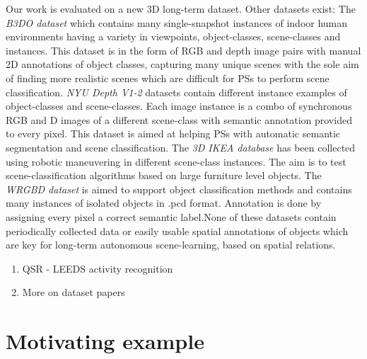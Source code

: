 \documentclass[letterpaper, 10 pt, conference]{ieeeconf}  %
\begin{document}
Our work is evaluated on a new 3D long-term dataset. Other datasets exist: The \textit{B3DO dataset} \cite{Janoch:ICCV2011} which contains many single-snapshot instances of indoor human environments having a variety in viewpoints, object-classes, scene-classes and instances. This dataset is in the form of RGB and depth image pairs with manual 2D annotations of object classes, capturing many unique scenes with the sole aim of finding more realistic scenes which are difficult for PSs to perform scene classification. \textit{NYU Depth V1-2} \cite{Silberman:ECCV2012} datasets contain different instance examples of object-classes and scene-classes. Each image instance is a combo of synchronous RGB and D images of a different scene-class with semantic annotation provided to every pixel. This dataset is aimed at helping PSs with automatic semantic segmentation and scene classification. The \textit{3D IKEA database} \cite{Swadzba:RAS2012} has been collected using robotic maneuvering in different scene-class instances. The aim is to test scene-classification algorithms based on large furniture level objects. The \textit{WRGBD dataset} \cite{Lai:ICRA2011} is aimed to support object classification methods and contains many instances of isolated objects in .pcd format. Annotation is done by assigning every pixel a correct semantic label.None of these datasets contain periodically collected data or easily usable spatial annotations of objects which are key for long-term autonomous scene-learning, based on spatial relations.


\begin{enumerate}
	\item QSR - LEEDS activity recognition
  \item More on dataset papers
\end{enumerate}


\section{Motivating example}
\label{sec:Test Case}
\end{document}
